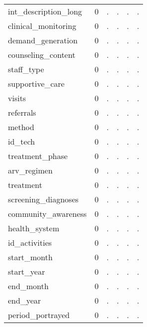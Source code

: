 \begin{table}[htbp]
\begin{tabular}{l*{1}{ccccc}}
int\_description\_long&           0&           .&           .&           .&           .\\
clinical\_monitoring&           0&           .&           .&           .&           .\\
demand\_generation&           0&           .&           .&           .&           .\\
counseling\_content&           0&           .&           .&           .&           .\\
staff\_type  &           0&           .&           .&           .&           .\\
supportive\_care&           0&           .&           .&           .&           .\\
visits      &           0&           .&           .&           .&           .\\
referrals   &           0&           .&           .&           .&           .\\
method      &           0&           .&           .&           .&           .\\
id\_tech     &           0&           .&           .&           .&           .\\
treatment\_phase&           0&           .&           .&           .&           .\\
arv\_regimen &           0&           .&           .&           .&           .\\
treatment   &           0&           .&           .&           .&           .\\
screening\_diagnoses&           0&           .&           .&           .&           .\\
community\_awareness&           0&           .&           .&           .&           .\\
health\_system&           0&           .&           .&           .&           .\\
id\_activities&           0&           .&           .&           .&           .\\
start\_month &           0&           .&           .&           .&           .\\
start\_year  &           0&           .&           .&           .&           .\\
end\_month   &           0&           .&           .&           .&           .\\
end\_year    &           0&           .&           .&           .&           .\\
period\_portrayed&           0&           .&           .&           .&           .\\

\end{tabular}
\end{table}
